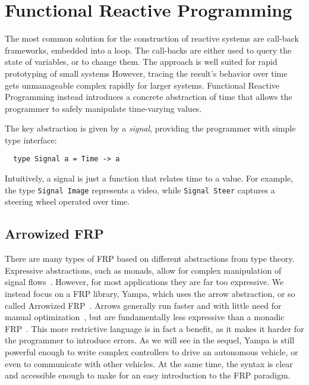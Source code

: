 \section{Functional Reactive Programming}

The most common solution for the construction of reactive systems are call-back frameworks, embedded into a loop.
The call-backs are either used to query the state of variables, or to change them.
The approach is well suited for rapid prototyping of small systems
However, tracing the result's behavior over time gets unmanageable complex rapidly for larger systems.
Functional Reactive Programming instead introduces a concrete abstraction of time that allows the programmer to safely manipulate time-varying values.

The key abstraction is given by a \textit{signal}, providing the programmer with simple type interface:

\begin{lstlisting}
  type Signal a = Time -> a
\end{lstlisting}

\noindent Intuitively, a signal is just a function that relates time to a value.
For example, the type \texttt{Signal Image} represents a video, while \texttt{Signal Steer} captures a steering wheel operated over time.

\subsection{Arrowized FRP}

There are many types of FRP based on different abstractions from type theory.
Expressive abstractions, such as monads, allow for complex manipulation of signal flows~\cite{van2014monadic}. 
However, for most applications they are far too expressive.
We instead focus on a FRP library, Yampa, which uses the arrow abstraction, or so called Arrowized FRP~\cite{hudak2003arrows}.
Arrows generally run faster and with little need for manual optimization~\cite{yallop2016causal}, but are fundamentally less expressive than a monadic FRP~\cite{lindley2011idioms}.
This more restrictive language is in fact a benefit, as it makes it harder for the programmer to introduce errors.
As we will see in the sequel, Yampa is still powerful enough to write complex controllers to drive an autonomous vehicle, or even to communicate with other vehicles.
At the same time, the syntax is clear and accessible enough to make for an easy introduction to the FRP paradigm.

